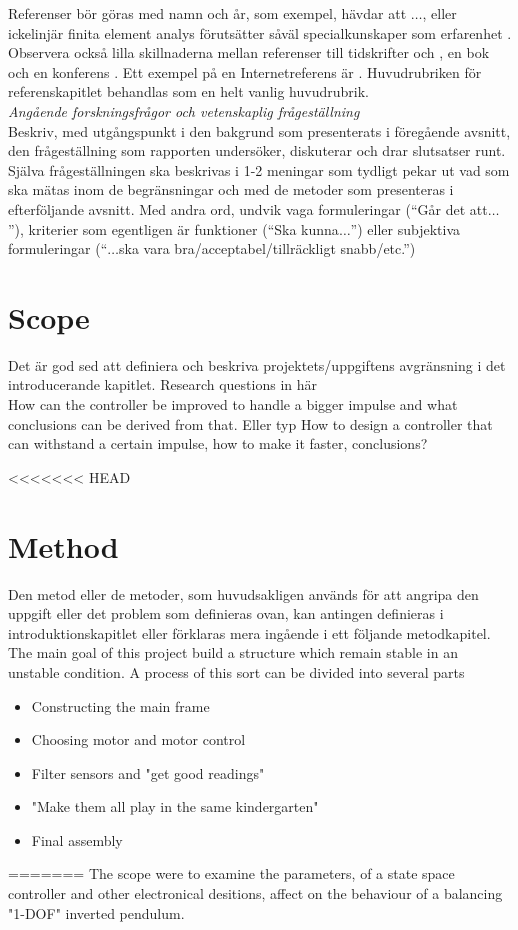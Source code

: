 \documentclass[a4paper,11pt]{kth-mag}
\begin{document}
\noindent{}Referenser bör göras med namn och år, som exempel, \cite{Angell1999} hävdar att $\ldots$, eller ickelinjär finita element analys förutsätter såväl specialkunskaper som erfarenhet \cite{DeBorst2012}. Observera också lilla skillnaderna mellan referenser till tidskrifter \cite{VanWezel2001} och \cite{Angell1999}, en bok \cite{DeBorst2012} och en konferens \cite{Eppinger2001}. Ett exempel på en Internetreferens är \cite{StandishGroup1994}. Huvudrubriken för referenskapitlet behandlas som en helt vanlig huvudrubrik. \\


\noindent{}\emph{Angående forskningsfrågor och vetenskaplig frågeställning}\\
Beskriv, med utgångspunkt i den bakgrund som presenterats i föregående avsnitt, den frågeställning som rapporten undersöker, diskuterar och drar slutsatser runt. Själva frågeställningen ska beskrivas i 1-2 meningar som tydligt pekar ut vad som ska mätas inom de begränsningar och med de metoder som presenteras i efterföljande avsnitt. Med andra ord, undvik vaga formuleringar (``Går det att$\ldots$''), kriterier som egentligen är funktioner (``Ska kunna$\ldots$'') eller subjektiva formuleringar (``$\ldots$ska vara bra/acceptabel/tillräckligt snabb/etc.'')
\section{Scope}
Det är god sed att definiera och beskriva projektets/uppgiftens  avgränsning i det introducerande kapitlet.
Research questions in här \\
How can the controller be improved to handle a bigger impulse and what conclusions can be derived from that. 
Eller typ How to design a controller that can withstand a certain impulse, how to make it faster, conclusions? 

<<<<<<< HEAD
\section{Method}
Den metod eller de metoder, som huvudsakligen används för att angripa den uppgift eller det problem som definieras ovan, kan antingen definieras i introduktionskapitlet eller förklaras mera ingående i ett följande metodkapitel.
\\
The main goal of this project build a structure which remain stable in an unstable condition. A process of this sort can be divided into several parts
\begin{itemize}
\item Constructing the main frame
\item Choosing motor and motor control
\item Filter sensors and "get good readings"
\item "Make them all play in the same kindergarten"
\item Final assembly
\end{itemize} 
=======
The scope were to examine the parameters, of a state space controller and other electronical desitions, affect on the behaviour of a balancing "1-DOF" inverted pendulum.
\end{document}
